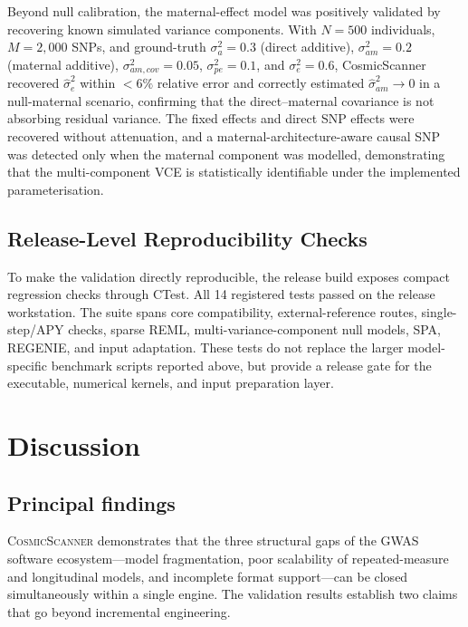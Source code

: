\documentclass[11pt,a4paper]{article}
\newcommand{\CosmicScanner}{\textsc{CosmicScanner}}
\begin{document}
Beyond null calibration, the maternal-effect model was positively validated by recovering known simulated variance components. With $N=500$ individuals, $M=2{,}000$ SNPs, and ground-truth $\sigma^2_a = 0.3$ (direct additive), $\sigma^2_{am} = 0.2$ (maternal additive), $\sigma^2_{am,cov} = 0.05$, $\sigma^2_{pe} = 0.1$, and $\sigma^2_e = 0.6$, CosmicScanner recovered $\hat{\sigma}^2_e$ within $<6\%$ relative error and correctly estimated $\hat{\sigma}^2_{am} \to 0$ in a null-maternal scenario, confirming that the direct--maternal covariance is not absorbing residual variance. The fixed effects and direct SNP effects were recovered without attenuation, and a maternal-architecture-aware causal SNP was detected only when the maternal component was modelled, demonstrating that the multi-component VCE is statistically identifiable under the implemented parameterisation.

\subsection{Release-Level Reproducibility Checks}
\label{sec:release_checks}

To make the validation directly reproducible, the release build exposes compact regression checks through CTest. All 14 registered tests passed on the release workstation. The suite spans core compatibility, external-reference routes, single-step/APY checks, sparse REML, multi-variance-component null models, SPA, REGENIE, and input adaptation. These tests do not replace the larger model-specific benchmark scripts reported above, but provide a release gate for the executable, numerical kernels, and input preparation layer.

\newpage
\section{Discussion}
\label{sec:discussion}

\subsection{Principal findings}

\CosmicScanner{} demonstrates that the three structural gaps of the GWAS software ecosystem---model fragmentation, poor scalability of repeated-measure and longitudinal models, and incomplete format support---can be closed simultaneously within a single engine. The validation results establish two claims that go beyond incremental engineering.
\end{document}
